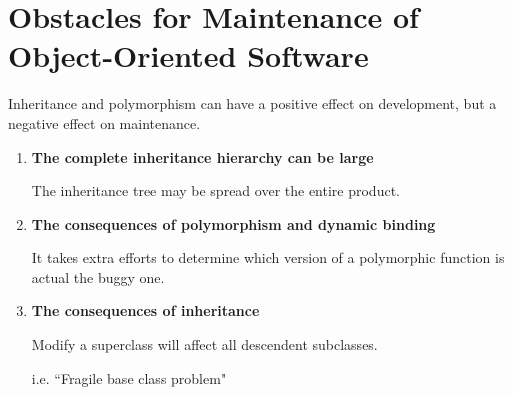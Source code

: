 \documentclass[11pt]{article}
\begin{document}
\section*{Obstacles for Maintenance of Object-Oriented Software}

Inheritance and polymorphism can have a positive effect on development, but a negative effect on maintenance.

\begin{enumerate}

	\item \textbf{The complete inheritance hierarchy can be large}
	
	The inheritance tree may be spread over the entire product.
	
	\item \textbf{The consequences of polymorphism and dynamic binding}
	
	It takes extra efforts to determine which version of a polymorphic function is actual the buggy one.
		
	\item \textbf{The consequences of inheritance}
	
	Modify a superclass will affect all descendent subclasses.
	
	i.e. ``Fragile base class problem"
	
\end{enumerate}
\end{document}
